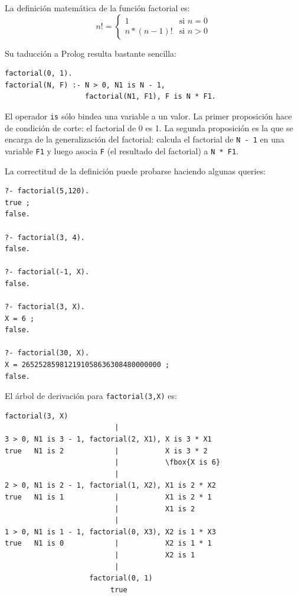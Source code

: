 \documentclass[12pt,titlepage]{article}
\begin{document}
La definición matemática de la función factorial es:
\[
n!=\left\{
  \begin{array}{ll}
    1 & \text{si } n=0 \\
    n*(n-1)! & \text{si } n>0
  \end{array}
\right.
\]

Su taducción a Prolog resulta bastante sencilla:
\begin{lstlisting}
factorial(0, 1).
factorial(N, F) :- N > 0, N1 is N - 1, 
                   factorial(N1, F1), F is N * F1.
\end{lstlisting}

El operador \lstinline|is| sólo bindea una variable a un valor. La primer proposición hace de condición de corte: el factorial de 0 es 1. La segunda proposición es la que se encarga de la generalización del factorial: calcula el factorial de \lstinline|N - 1| en una variable \lstinline|F1| y luego asocia \lstinline|F| (el resultado del factorial) a \lstinline|N * F1|.

La correctitud de la definición puede probarse haciendo algunas queries:
\begin{lstlisting}
?- factorial(5,120).
true ;
false.

?- factorial(3, 4).
false.

?- factorial(-1, X).
false.

?- factorial(3, X).
X = 6 ;
false.

?- factorial(30, X).
X = 265252859812191058636308480000000 ;
false.
\end{lstlisting}

El árbol de derivación para \lstinline|factorial(3,X)| es:
\begin{Verbatim}[samepage=true,fontsize=\small,commandchars=\\\{\}]
                    factorial(3, X)
                          |
3 > 0, N1 is 3 - 1, factorial(2, X1), X is 3 * X1
true   N1 is 2            |           X is 3 * 2
                          |           \fbox{X is 6}
                          |
2 > 0, N1 is 2 - 1, factorial(1, X2), X1 is 2 * X2
true   N1 is 1            |           X1 is 2 * 1
                          |           X1 is 2
                          |
1 > 0, N1 is 1 - 1, factorial(0, X3), X2 is 1 * X3
true   N1 is 0            |           X2 is 1 * 1
                          |           X2 is 1
                          |
                    factorial(0, 1)
                         true
\end{Verbatim}
\end{document}

